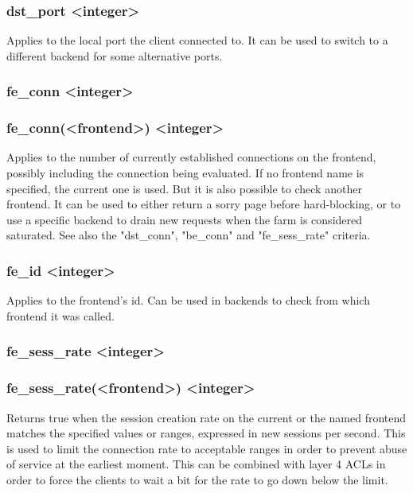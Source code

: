 \subsubsection[dst\_port]{dst\_port <integer>}
  Applies to the local port the client connected to. It can be used to switch
  to a different backend for some alternative ports.

\subsubsection[fe_conn]{fe\_conn <integer>}
\subsubsection*{fe\_conn(<frontend>) <integer>}
  Applies to the number of currently established connections on the frontend,
  possibly including the connection being evaluated. If no frontend name is
  specified, the current one is used. But it is also possible to check another
  frontend. It can be used to either return a sorry page before hard-blocking,
  or to use a specific backend to drain new requests when the farm is
  considered saturated. See also the "dst\_conn", "be\_conn" and "fe\_sess\_rate"
  criteria.

\subsubsection[fe\_id]{fe\_id <integer>}
  Applies to the frontend's id. Can be used in backends to check from which
  frontend it was called.

\subsubsection[fe\_sess\_rate]{fe\_sess\_rate <integer>}
\subsubsection*{fe\_sess\_rate(<frontend>) <integer>}
  Returns true when the session creation rate on the current or the named
  frontend matches the specified values or ranges, expressed in new sessions
  per second. This is used to limit the connection rate to acceptable ranges in
  order to prevent abuse of service at the earliest moment. This can be
  combined with layer 4 ACLs in order to force the clients to wait a bit for
  the rate to go down below the limit.

